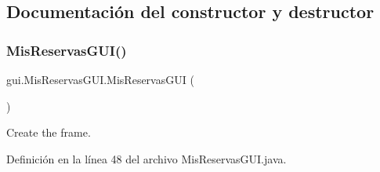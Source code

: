 \subsection{Documentación del constructor y destructor}
\mbox{\label{classgui_1_1_mis_reservas_g_u_i_a1ebc31bd1d49fb416e11887848fe61b3}} 
\subsubsection{\texorpdfstring{MisReservasGUI()}{MisReservasGUI()}}
{\footnotesize\ttfamily gui.\+Mis\+Reservas\+G\+U\+I.\+Mis\+Reservas\+G\+UI (\begin{DoxyParamCaption}{ }\end{DoxyParamCaption})}



Create the frame. 



Definición en la línea 48 del archivo Mis\+Reservas\+G\+U\+I.\+java.


